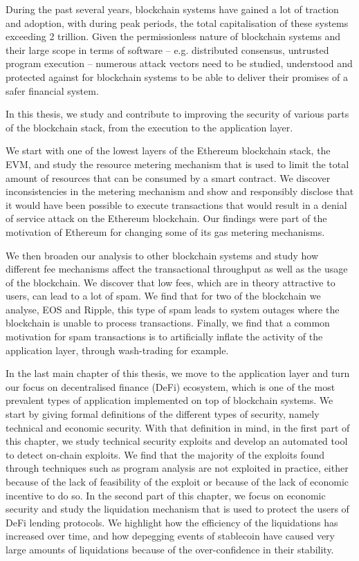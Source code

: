 During the past several years, blockchain systems have gained a lot of traction and adoption, with during peak periods, the total capitalisation of these systems exceeding 2 trillion.
Given the permissionless nature of blockchain systems and their large scope in terms of software -- e.g. distributed consensus, untrusted program execution -- numerous attack vectors need to be studied, understood and protected against for blockchain systems to be able to deliver their promises of a safer financial system.

In this thesis, we study and contribute to improving the security of various parts of the blockchain stack, from the execution to the application layer.

We start with one of the lowest layers of the Ethereum blockchain stack, the EVM, and study the resource metering mechanism that is used to limit the total amount of resources that can be consumed by a smart contract.
We discover inconsistencies in the metering mechanism and show and responsibly disclose that it would have been possible to execute transactions that would result in a denial of service attack on the Ethereum blockchain.
Our findings were part of the motivation of Ethereum for changing some of its gas metering mechanisms.

We then broaden our analysis to other blockchain systems and study how different fee mechanisms affect the transactional throughput as well as the usage of the blockchain.
We discover that low fees, which are in theory attractive to users, can lead to a lot of spam.
We find that for two of the blockchain we analyse, EOS and Ripple, this type of spam leads to system outages where the blockchain is unable to process transactions.
Finally, we find that a common motivation for spam transactions is to artificially inflate the activity of the application layer, through wash-trading for example.

In the last main chapter of this thesis, we move to the application layer and turn our focus on decentralised finance (DeFi) ecosystem, which is one of the most prevalent types of application implemented on top of blockchain systems.
We start by giving formal definitions of the different types of security, namely technical and economic security.
With that definition in mind, in the first part of this chapter, we study technical security exploits and develop an automated tool to detect on-chain exploits.
We find that the majority of the exploits found through techniques such as program analysis are not exploited in practice, either because of the lack of feasibility of the exploit or because of the lack of economic incentive to do so.
In the second part of this chapter, we focus on economic security and study the liquidation mechanism that is used to protect the users of DeFi lending protocols.
We highlight how the efficiency of the liquidations has increased over time, and how depegging events of stablecoin have caused very large amounts of liquidations because of the over-confidence in their stability.